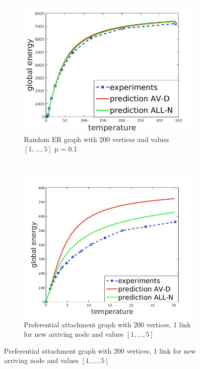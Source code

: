 \documentclass[12pt]{report}
\begin{document}
\begin{figure}[t]
    \centering
    \begin{subfigure}[b]{0.4\textwidth}
        \includegraphics[width=\textwidth]{er200x01}
        \caption{ Random ER graph with 200 vertices and values $[1, ..., 5]$ p = 0.1}

    \end{subfigure}
	~
    \begin{subfigure}[b]{0.4\textwidth}
        \includegraphics[width=\textwidth]{pa200x1}
        \caption{ Preferential attachment graph with 200 vertices, 1 link for new arriving node and values $[1, ..., 5]$  }


\end{subfigure}
\end{figure}
\end{document}
